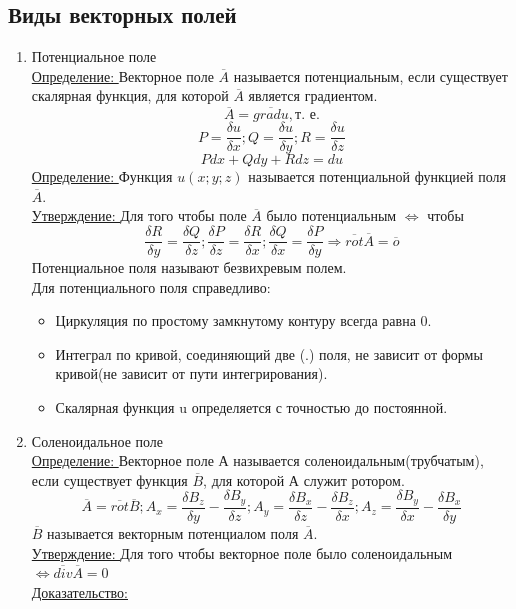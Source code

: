 \documentclass[12pt]{article}
\begin{document}
\subsection{Виды векторных полей}
\begin{enumerate}
  \item Потенциальное поле\\
  \underline{Определение: } Векторное поле $\overline{A}$ называется потенциальным, если существует скалярная функция,
  для которой $\overline{A}$ является градиентом.
  \[\overline{A}=\overline{gradu},\text{т. е.}\]
  \[P=\frac{\delta u}{\delta x};Q=\frac{\delta u}{\delta y}; R= \frac{\delta u}{\delta z}\]
  \[Pdx+Qdy+Rdz=du\]
  \underline{Определение: } Функция $u(x;y;z)$ называется потенциальной функцией поля $\overline{A}$.\\
  \underline{Утверждение: } Для того чтобы поле $\overline{A}$ было потенциальным $\Leftrightarrow$ чтобы 
  \[\frac{\delta R}{\delta y}=\frac{\delta Q}{\delta z};\frac{\delta P}{\delta z}=\frac{\delta R}{\delta x};
  \frac{\delta Q}{\delta x}=\frac{\delta P}{\delta y} \Rightarrow \boxed{\overline{rot}\overline{A}=\overline{o}}\]
  Потенциальное поля называют безвихревым полем.\\
  Для потенциального поля справедливо:
  \begin{itemize}
    \item Циркуляция по простому замкнутому контуру всегда равна 0.
    \item Интеграл по кривой, соединяющий две (.) поля, не зависит от формы кривой(не зависит от пути интегрирования).
    \item  Скалярная функция u определяется с точностью до постоянной.
  \end{itemize}
  \item Соленоидальное поле\\
  \underline{Определение: } Векторное поле А называется соленоидальным(трубчатым), если существует
  функция $\overline{B}$, для которой А служит ротором.
  \[\overline{A}=\overline{rot}\overline{B}; 
  A_x=\frac{\delta B_z}{\delta y}-\frac{\delta B_y}{\delta z};
  A_y=\frac{\delta B_x}{\delta z}-\frac{\delta B_z}{\delta x};
  A_z=\frac{\delta B_y}{\delta x}-\frac{\delta B_x}{\delta y}\]
  $\overline{B}$ называется векторным потенциалом поля $\overline{A}$.\\
  \underline{Утверждение: } Для того чтобы векторное поле было соленоидальным $\Leftrightarrow \boxed{\overline{div}\overline{A}=0}$\\
  \pagebreak
  \underline{Доказательство:}

\end{enumerate}
\end{document}
